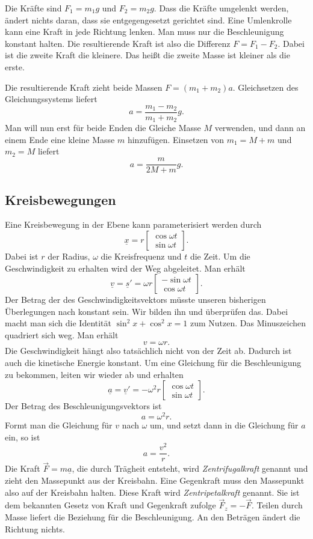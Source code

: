 \documentclass[a4paper,10pt,fleqn,twocolumn,twoside]{article}
\begin{document}
Die Kräfte sind \(F_1 = {m_1}g\) und \(F_2 = {m_2}g\). Dass die Kräfte
umgelenkt werden, ändert nichts daran, dass sie entgegengesetzt
gerichtet sind. Eine Umlenkrolle kann eine Kraft in jede Richtung
lenken. Man muss nur die Beschleunigung konstant halten. Die
resultierende Kraft ist also die Differenz \(F=F_1-F_2\).
Dabei ist die zweite Kraft die kleinere. Das heißt die zweite
Masse ist kleiner als die erste.

Die resultierende Kraft zieht beide Massen \(F=(m_1+m_2)a\).
Gleichsetzen des Gleichungssystems liefert
\[a = \frac{m_1-m_2}{m_1+m_2}g.\]
Man will nun erst für beide Enden die Gleiche Masse \(M\) verwenden,
und dann an einem Ende eine kleine Masse \(m\) hinzufügen. Einsetzen
von \(m_1=M+m\) und \(m_2=M\) liefert
\[a = \frac{m}{2M+m} g.\]

\subsection{Kreisbewegungen}

Eine Kreisbewegung in der Ebene kann parameterisiert werden durch
\[\underline x = r \begin{bmatrix}
\cos\omega t\\
\sin\omega t
\end{bmatrix}.\]
Dabei ist \(r\) der Radius, \(\omega\) die Kreisfrequenz und \(t\)
die Zeit. Um die Geschwindigkeit zu erhalten wird der Weg abgeleitet.
Man erhält
\[\underline v = \underline s'
= \omega r \begin{bmatrix}
-\sin\omega t\\
\cos\omega t
\end{bmatrix}.\]
Der Betrag der des Geschwindigkeitsvektors müsste unseren bisherigen
Überlegungen nach konstant sein. Wir bilden ihn und überprüfen das.
Dabei macht man sich die Identität \(\sin^2 x+\cos^2 x=1\) zum Nutzen.
Das Minuszeichen quadriert sich weg. Man erhält
\[v = \omega r.\]
Die Geschwindigkeit hängt also tatsächlich nicht von der Zeit ab.
Dadurch ist auch die kinetische Energie konstant. Um eine Gleichung
für die Beschleunigung zu bekommen, leiten wir wieder ab und erhalten
\[\underline a = \underline v' = - {\omega^2}r
\begin{bmatrix}
\cos\omega t\\
\sin\omega t\end{bmatrix}.
\]
Der Betrag des Beschleunigungsvektors ist
\[a = {\omega^2}r.\]
Formt man die Gleichung für \(v\) nach \(\omega\) um, und setzt dann
in die Gleichung für \(a\) ein, so ist
\[a = \frac{v^2}{r}.\]
Die Kraft \(\vec F=m\underline a\), die durch Trägheit entsteht,
wird \textit{Zentrifugalkraft} genannt und zieht den Massepunkt
aus der Kreisbahn. Eine Gegenkraft muss den Massepunkt also auf der
Kreisbahn halten. Diese Kraft wird \textit{Zentripetalkraft} genannt.
Sie ist dem bekannten Gesetz von Kraft und Gegenkraft zufolge
\(\vec F_z = -\vec F\). Teilen durch Masse liefert die Beziehung
für die Beschleunigung. An den Beträgen ändert die Richtung nichts.
\end{document}
